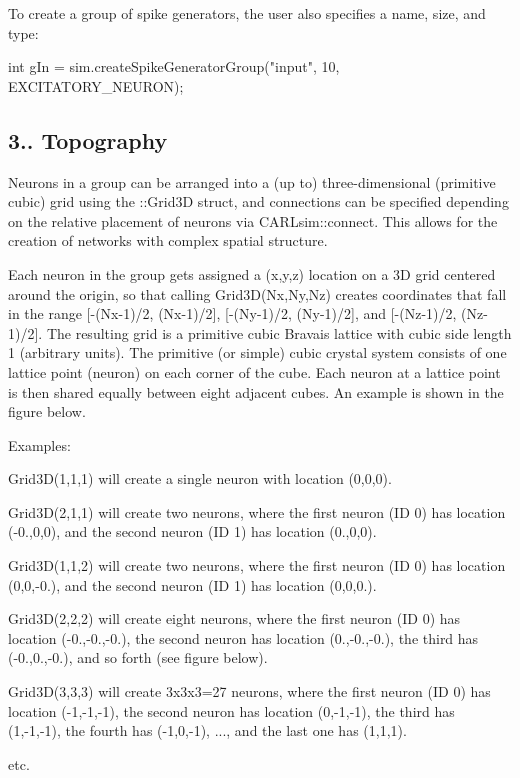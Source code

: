 To create a group of spike generators, the user also specifies a name, size, and type\+: 
\begin{DoxyCode}
\textcolor{keywordtype}{int} gIn = sim.createSpikeGeneratorGroup(\textcolor{stringliteral}{"input"}, 10, EXCITATORY\_NEURON);
\end{DoxyCode}
\hypertarget{ch3_neurons_synapses_groups_ch3s3s2_topography}{}\subsection{3.. Topography}\label{ch3_neurons_synapses_groups_ch3s3s2_topography}
Neurons in a group can be arranged into a (up to) three-\/dimensional (primitive cubic) grid using the \+::\+Grid3D struct, and connections can be specified depending on the relative placement of neurons via C\+A\+R\+Lsim\+::connect. This allows for the creation of networks with complex spatial structure.

Each neuron in the group gets assigned a (x,y,z) location on a 3D grid centered around the origin, so that calling Grid3\+D(\+Nx,\+Ny,\+Nz) creates coordinates that fall in the range \mbox{[}-\/(Nx-\/1)/2, (Nx-\/1)/2\mbox{]}, \mbox{[}-\/(Ny-\/1)/2, (Ny-\/1)/2\mbox{]}, and \mbox{[}-\/(Nz-\/1)/2, (Nz-\/1)/2\mbox{]}. The resulting grid is a primitive cubic Bravais lattice with cubic side length 1 (arbitrary units). The primitive (or simple) cubic crystal system consists of one lattice point (neuron) on each corner of the cube. Each neuron at a lattice point is then shared equally between eight adjacent cubes. An example is shown in the figure below.

 Examples\+:
\begin{DoxyItemize}
\item Grid3\+D(1,1,1) will create a single neuron with location (0,0,0).
\item Grid3\+D(2,1,1) will create two neurons, where the first neuron (ID 0) has location (-\/0.,0,0), and the second neuron (ID 1) has location (0.,0,0).
\item Grid3\+D(1,1,2) will create two neurons, where the first neuron (ID 0) has location (0,0,-\/0.), and the second neuron (ID 1) has location (0,0,0.).
\item Grid3\+D(2,2,2) will create eight neurons, where the first neuron (ID 0) has location (-\/0.,-\/0.,-\/0.), the second neuron has location (0.,-\/0.,-\/0.), the third has (-\/0.,0.,-\/0.), and so forth (see figure below).
\item Grid3\+D(3,3,3) will create 3x3x3=27 neurons, where the first neuron (ID 0) has location (-\/1,-\/1,-\/1), the second neuron has location (0,-\/1,-\/1), the third has (1,-\/1,-\/1), the fourth has (-\/1,0,-\/1), ..., and the last one has (1,1,1).
\item etc.
\end{DoxyItemize}

